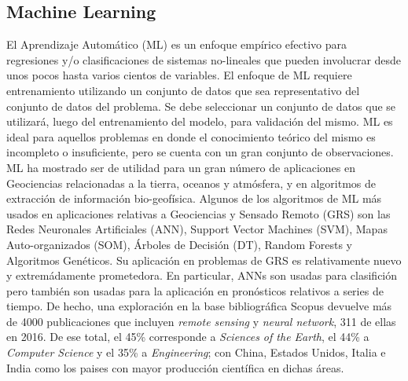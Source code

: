 



\subsection{Machine Learning}


El Aprendizaje Automático (ML) es un enfoque empírico efectivo para
regresiones y/o clasificaciones de sistemas no-lineales que pueden involucrar desde
unos pocos hasta varios cientos de variables. El enfoque de ML requiere
entrenamiento utilizando un conjunto de datos que sea representativo del conjunto
de datos del problema. Se debe seleccionar un conjunto de datos que se utilizará,
luego del entrenamiento del modelo, para validación del mismo.
ML es ideal para aquellos problemas en donde el conocimiento teórico del mismo
es incompleto o insuficiente, pero se cuenta con un gran conjunto de observaciones.
ML ha mostrado ser de utilidad para un gran número de aplicaciones en Geociencias
relacionadas a la tierra, oceanos y atmósfera, y en algoritmos de extracción
de información bio-geofísica.
Algunos de los algoritmos de ML más usados en aplicaciones relativas a
Geociencias y Sensado Remoto (GRS) son las Redes Neuronales Artificiales (ANN),
Support Vector Machines (SVM), Mapas Auto-organizados (SOM), Árboles de Decisión (DT),
Random Forests y Algoritmos Genéticos. Su aplicación en problemas de GRS es
relativamente nuevo y extremádamente prometedora. En particular, ANNs son
usadas para clasifición pero también son usadas para la aplicación en pronósticos
relativos a series de tiempo.
De hecho, una exploración en la base bibliográfica Scopus devuelve más de 4000
publicaciones que incluyen \textit{remote sensing} y \textit{neural network},
311 de ellas en 2016. De ese total, el 45\% corresponde a
\textit{Sciences of the Earth}, el 44\% a \textit{Computer Science} y el 35\% a
\textit{Engineering}; con China, Estados Unidos, Italia e India como los paises
con mayor producción científica en dichas áreas.


